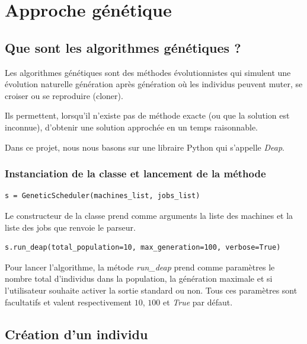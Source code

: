 \section{Approche génétique}

\subsection{Que sont les algorithmes génétiques ?}

Les algorithmes génétiques sont des méthodes évolutionnistes qui simulent une évolution naturelle génération après génération où les individus peuvent muter, se croiser ou se reproduire (cloner).

Ils permettent, lorsqu'il n'existe pas de méthode exacte (ou que la solution est inconnue), d'obtenir une solution approchée en un temps raisonnable.

Dans ce projet, nous nous basons sur une libraire Python qui s'appelle \textit{Deap}.

\subsubsection{Instanciation de la classe et lancement de la méthode}

\begin{lstlisting}
s = GeneticScheduler(machines_list, jobs_list)
\end{lstlisting}

Le constructeur de la classe prend comme arguments la liste des machines et la liste des jobs que renvoie le parseur.

\begin{lstlisting}
s.run_deap(total_population=10, max_generation=100, verbose=True)
\end{lstlisting}

Pour lancer l'algorithme, la métode \textit{run\_deap} prend comme paramètres le nombre total d'individus dans la population, la génération maximale et si l'utilisateur souhaite activer la sortie standard ou non. Tous ces paramètres sont facultatifs et valent respectivement $10$, $100$ et \textit{True} par défaut.

\subsection{Création d'un individu}



